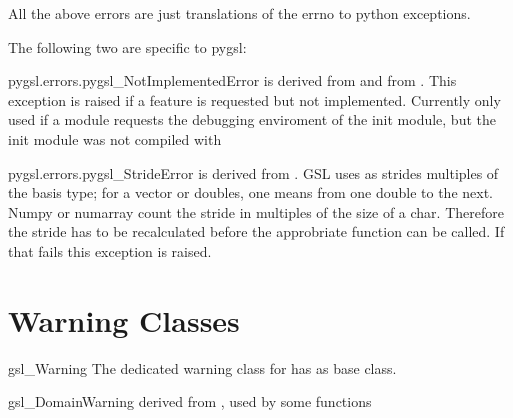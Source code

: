 All the above errors are just translations of the errno to python exceptions.

The following two are specific to pygsl:
\begin{excclassdesc}{pygsl.errors.pygsl_NotImplementedError}{}
is derived from   and from   .
This exception is raised if a feature is requested but not
implemented. Currently only used if a module requests the debugging enviroment
of the init module, but the init module was not compiled with 
\end{excclassdesc}
\begin{excclassdesc}{pygsl.errors.pygsl_StrideError}{}
is derived from   .
GSL uses as strides multiples of the basis type; for a vector or doubles, one
means from one double to the next. Numpy or numarray count the stride in
multiples of the size of a char. Therefore the stride has to be recalculated
before the approbriate \gsl{} function can be called. If that fails this
exception is raised.
\end{excclassdesc}

\section{Warning Classes}

\begin{excclassdesc} {gsl_Warning}{}
The dedicated warning class for \gsl{} has  as base class.
\end{excclassdesc}

\begin{excclassdesc}{gsl_DomainWarning}{}
derived from , used by some  functions
\end{excclassdesc}
